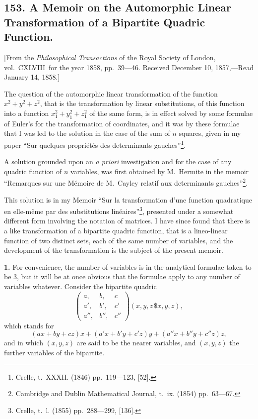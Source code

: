 \documentclass[11pt,a4paper]{book}
\begin{document}
\begin{center}
\newpage

\section*{153. A Memoir on the Automorphic Linear Transformation of a Bipartite Quadric Function.}

[From the \textit{Philosophical Transactions} of the Royal Society of London, vol.~CXLVIII\ for the year 1858, pp.~39---46.
Received December 10, 1857,---Read January 14, 1858.]

\bigskip

The question of the automorphic linear transformation of the function $x^2+y^2+z^2$, that is the transformation by linear substitutions, of this function into a function $x_1^2+y_1^2+z_1^2$ of the same form, is in effect solved by some formulae of Euler's for the transformation of coordinates, and it was by these formulae that I was led to the solution in the case of the sum of $n$ squares, given in my paper ``Sur quelques propri\'et\'es des determinants gauches''\footnote{Crelle, t.~XXXII. (1846) pp.~119---123, [52].}.

A solution grounded upon an \textit{a priori} investigation and for the case of any quadric function of $n$ variables, was first obtained by M.~Hermite in the memoir ``Remarques sur une M\'emoire de M.~Cayley relatif aux determinants gauches''\footnote{Cambridge and Dublin Mathematical Journal, t.~ix. (1854) pp.~63---67.}.

This solution is in my Memoir ``Sur la transformation d'une function quadratique en elle-m\^eme par des substitutions lin\'eaires''\footnote{Crelle, t.~l. (1855) pp.~288---299, [136].}, presented under a somewhat different form involving the notation of matrices. I have since found that there is a like transformation of a bipartite quadric function, that is a lineo-linear function of two distinct sets, each of the same number of variables, and the development of the transformation is the subject of the present memoir.

\medskip
\noindent\textbf{1.} For convenience, the number of variables is in the analytical formulae taken to be 3, but it will be at once obvious that the formulae apply to any number of variables whatever. Consider the bipartite quadric
\[
\begin{pmatrix} a, & b, & c \\ a', & b', & c' \\ a'', & b'', & c'' \end{pmatrix}(x,y,z\,\$x,y,z),
\]
which stands for
\[(ax+by+cz)x + (a'x+b'y+c'z)y + (a''x+b''y+c''z)z,\]
and in which $(x,y,z)$ are said to be the nearer variables, and $(x,y,z)$ the further variables of the bipartite.


\end{center}
\end{document}
